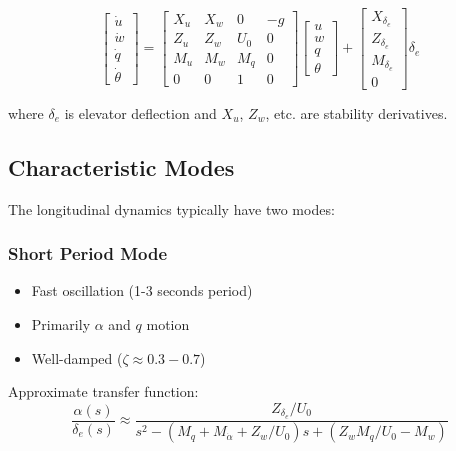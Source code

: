 \begin{equation}
\begin{bmatrix} \dot{u} \\ \dot{w} \\ \dot{q} \\ \dot{\theta} \end{bmatrix} =
\begin{bmatrix}
X_u & X_w & 0 & -g \\
Z_u & Z_w & U_0 & 0 \\
M_u & M_w & M_q & 0 \\
0 & 0 & 1 & 0
\end{bmatrix}
\begin{bmatrix} u \\ w \\ q \\ \theta \end{bmatrix} +
\begin{bmatrix} X_{\delta_e} \\ Z_{\delta_e} \\ M_{\delta_e} \\ 0 \end{bmatrix} \delta_e
\end{equation}

where $\delta_e$ is elevator deflection and $X_u$, $Z_w$, etc. are stability derivatives.

\subsection{Characteristic Modes}

The longitudinal dynamics typically have two modes:

\subsubsection{Short Period Mode}
\begin{itemize}
    \item Fast oscillation (1-3 seconds period)
    \item Primarily $\alpha$ and $q$ motion
    \item Well-damped ($\zeta \approx 0.3-0.7$)
\end{itemize}

Approximate transfer function:
\begin{equation}
\frac{\alpha(s)}{\delta_e(s)} \approx \frac{Z_{\delta_e}/U_0}{s^2 - (M_q + M_{\dot{\alpha}} + Z_w/U_0)s + (Z_w M_q/U_0 - M_w)}
\end{equation}

